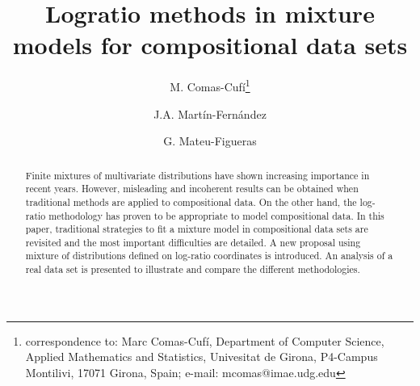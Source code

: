 \documentclass[12pt, a4paper]{article}
\title{Logratio methods in mixture models for compositional data sets}
\author[1]{M. Comas-Cufí\thanks{correspondence to: Marc Comas-Cufí, Department of Computer Science, Applied Mathematics and Statistics, Univesitat de Girona, P4-Campus Montilivi, 17071 Girona, Spain; e-mail: mcomas@imae.udg.edu}}%
\author[1]{J.A. Martín-Fernández}
\author[1]{G. Mateu-Figueras}
\affil[1]{\small Department of Computer Science, Applied Mathematics and Statistics, Universitat de Girona}
\begin{document}
\maketitle



\providecommand{\keywords}[1]{\textbf{Keywords:} #1}
\providecommand{\msc}[1]{\textbf{MSC2010:} #1}

\begin{abstract}
Finite mixtures of multivariate distributions have shown increasing importance in recent years. However, misleading and incoherent results can be obtained when traditional methods are applied to compositional data. On the other hand, the log-ratio methodology has proven to be appropriate to model compositional data. In this paper, traditional strategies to fit a mixture model in compositional data sets are revisited and the most important difficulties are detailed. A new proposal using mixture of distributions defined on log-ratio coordinates is introduced. An analysis of a real data set is presented to illustrate and compare the different methodologies.

\end{abstract}
\end{document}
